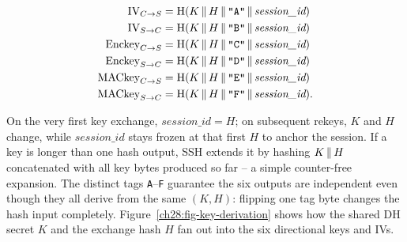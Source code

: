\[
\begin{aligned}
\text{IV}_{C \to S}     &= \operatorname{H}(K \,\|\, H \,\|\, \texttt{"A"} \,\|\, \textit{session\_id}) \\
\text{IV}_{S \to C}     &= \operatorname{H}(K \,\|\, H \,\|\, \texttt{"B"} \,\|\, \textit{session\_id}) \\
\text{Enckey}_{C \to S} &= \operatorname{H}(K \,\|\, H \,\|\, \texttt{"C"} \,\|\, \textit{session\_id}) \\
\text{Enckey}_{S \to C} &= \operatorname{H}(K \,\|\, H \,\|\, \texttt{"D"} \,\|\, \textit{session\_id}) \\
\text{MACkey}_{C \to S} &= \operatorname{H}(K \,\|\, H \,\|\, \texttt{"E"} \,\|\, \textit{session\_id}) \\
\text{MACkey}_{S \to C} &= \operatorname{H}(K \,\|\, H \,\|\, \texttt{"F"} \,\|\, \textit{session\_id}) .
\end{aligned}
\]

On the very first key exchange, $\textit{session\_id} = H$; on subsequent rekeys, $K$ and $H$ change, while $\textit{session\_id}$ stays frozen at that first $H$ to anchor the session. If a key is longer than one hash output, SSH extends it by hashing $K \,\|\, H$ concatenated with all key bytes produced so far -- a simple counter-free expansion. The distinct tags \texttt{A}--\texttt{F} guarantee the six outputs are independent even though they all derive from the same $(K,H)$: flipping one tag byte changes the hash input completely. Figure~\ref{ch28:fig-key-derivation} shows how the shared DH secret $K$ and the exchange hash $H$ fan out into the six directional keys and IVs.

